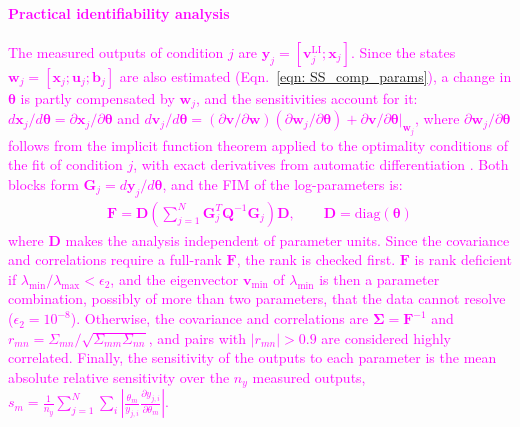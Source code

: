 \documentclass[conference]{IEEEtran}
\begin{document}
\paragraph{\textcolor{magenta}{Practical identifiability analysis}}
\textcolor{magenta}{The measured outputs of condition $j$ are $\mathbf{y}_j=[\mathbf{v}^{\text{LI}}_j;\mathbf{x}_j]$. Since the states $\mathbf{w}_j=[\mathbf{x}_j;\mathbf{u}_j;\mathbf{b}_j]$ are also estimated (Eqn.~\ref{eqn: SS_comp_params}), a change in $\boldsymbol{\theta}$ is partly compensated by $\mathbf{w}_j$, and the sensitivities account for it: $d\mathbf{x}_j/d\boldsymbol{\theta} = \partial \mathbf{x}_j/\partial \boldsymbol{\theta}$ and $d\mathbf{v}_j/d\boldsymbol{\theta} = (\partial \mathbf{v}/\partial \mathbf{w})(\partial \mathbf{w}_j/\partial \boldsymbol{\theta}) + \partial \mathbf{v}/\partial \boldsymbol{\theta}|_{\mathbf{w}_j}$,
where $\partial\mathbf{w}_j/\partial\boldsymbol{\theta}$ follows from the implicit function theorem applied to the optimality conditions of the fit of condition $j$, with exact derivatives from automatic differentiation \cite{Andersson2019CasADisoftwareframeworknonlinearoptimizationoptimalcontrol}. Both blocks form $\mathbf{G}_j = d\mathbf{y}_j/d\boldsymbol{\theta}$, and the FIM of the log-parameters is:
\begin{align}
    \mathbf{F} = \mathbf{D}\left(\sum_{j=1}^{N} \mathbf{G}^T_j\mathbf{Q}^{-1}\mathbf{G}_j\right)\mathbf{D}, \qquad \mathbf{D}=\mathrm{diag}(\boldsymbol{\theta})
    \label{eqn: FIM}
\end{align}
where $\mathbf{D}$ makes the analysis independent of parameter units. Since the covariance and correlations require a full-rank $\mathbf{F}$, the rank is checked first. $\mathbf{F}$ is rank deficient if $\lambda_{\min}/\lambda_{\max}<\epsilon_2$, and the eigenvector $\mathbf{v}_{\min}$ of $\lambda_{\min}$ is then a parameter combination, possibly of more than two parameters, that the data cannot resolve ($\epsilon_2 = 10^{-8}$). Otherwise, the covariance and correlations are 
$\mathbf{\Sigma} = \mathbf{F}^{-1}$ and $r_{mn} = \Sigma_{mn}/\sqrt{\Sigma_{mm}\Sigma_{nn}}
    $\cite{Sanchez2014HIPPOIterativeReparametrization},
and pairs with $|r_{mn}|>0.9$ are considered highly correlated. Finally, the sensitivity of the outputs to each parameter is the mean absolute relative sensitivity over the $n_y$ measured outputs, $s_m = \frac{1}{n_y}\sum_{j=1}^{N}\sum_{i}\left|\frac{\theta_m}{y_{j,i}}\frac{\partial y_{j,i}}{\partial \theta_m}\right|$.}
\end{document}

